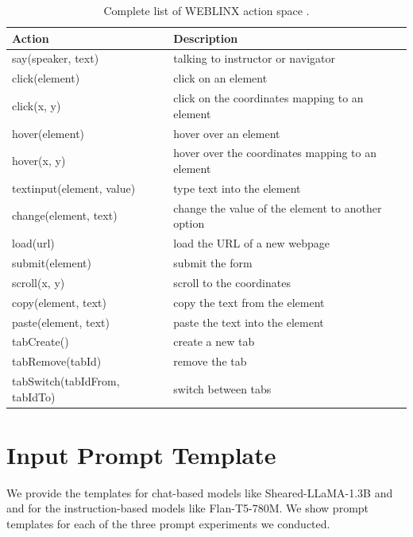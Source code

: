 \documentclass[11pt]{article}
\begin{document}
\clearpage
\clearpage
\begin{table}[h]
\centering
\caption{Complete list of WEBLINX action space \label{tab:table9} \cite{lxinghan_2024_weblinx}.}
\label{webLinx_action_space}
\begin{tabular}{ll}
\hline
\textbf{Action}             & \textbf{Description}                              \\ \hline
say(speaker, text)          & talking to instructor or navigator                \\
click(element)              & click on an element                                \\
click(x, y)                 & click on the coordinates mapping to an element    \\
hover(element)              & hover over an element                              \\
hover(x, y)                 & hover over the coordinates mapping to an element  \\
textinput(element, value)   & type text into the element                        \\
change(element, text)       & change the value of the element to another option \\
load(url)                   & load the URL of a new webpage                     \\
submit(element)             & submit the form                                    \\
scroll(x, y)                & scroll to the coordinates                         \\
copy(element, text)         & copy the text from the element                    \\
paste(element, text)        & paste the text into the element                   \\
tabCreate()                 & create a new tab                                  \\
tabRemove(tabId)            & remove the tab                                    \\
tabSwitch(tabIdFrom, tabIdTo) & switch between tabs                             \\
\hline
\end{tabular}
\end{table}

\section{Input Prompt Template}\label{sec:template}
We provide the templates for chat-based models like Sheared-LLaMA-1.3B and and for the instruction-based models like Flan-T5-780M. We show prompt templates for each of the three prompt experiments we conducted. 
\end{document}
